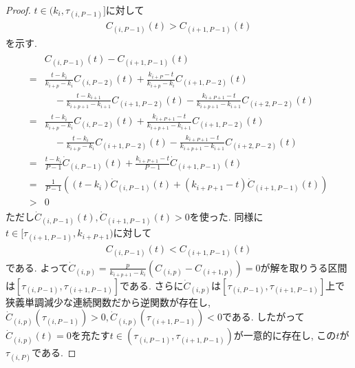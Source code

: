 \documentclass{jsarticle}
\newcommand\Pare[1]{\left(#1\right)}
\theoremstyle{definition}%
\begin{document}
\begin{proof}
    $t\in (k_{i},\tau_{(i,P-1)}]$に対して
    \begin{align}
        C_{(i,P-1)}(t)>C_{(i+1,P-1)}(t)
    \end{align}
    を示す.
    \begin{align}
        \begin{aligned}
            &{}C_{(i,P-1)}(t)-C_{(i+1,P-1)}(t) \\
            ={}&\frac{t-k_{i}}{k_{i+p}-k_{i}}C_{(i,P-2)}(t)+\frac{k_{i+P}-t}{k_{i+p}-k_{i}}C_{(i+1,P-2)}(t) \\
            &\quad-\frac{t-k_{i+1}}{k_{i+p+1}-k_{i+1}}C_{(i+1,P-2)}(t)-\frac{k_{i+P+1}-t}{k_{i+p+1}-k_{i+1}}C_{(i+2,P-2)}(t) \\
            ={}&\frac{t-k_{i}}{k_{i+p}-k_{i}}C_{(i,P-2)}(t)+\frac{k_{i+P+1}-t}{k_{i+p+1}-k_{i+1}}C_{(i+1,P-2)}(t) \\
            &\quad-\frac{t-k_{i}}{k_{i+p}-k_{i}}C_{(i+1,P-2)}(t)-\frac{k_{i+P+1}-t}{k_{i+p+1}-k_{i+1}}C_{(i+2,P-2)}(t) \\
            ={}&\frac{t-k_{i}}{P-1}\dot{C}_{(i,P-1)}(t)+\frac{k_{i+P+1}-t}{P-1}\dot{C}_{(i+1,P-1)}(t) \\
            ={}&\frac{1}{P-1}\Pare{\Pare{t-k_{i}}\dot{C}_{(i,P-1)}(t)+\Pare{k_{i+P+1}-t}\dot{C}_{(i+1,P-1)}(t)} \\
            >{}&0
        \end{aligned}
    \end{align}
    ただし$\dot{C}_{(i,P-1)}(t),\dot{C}_{(i+1,P-1)}(t)>0$を使った.
    同様に$t\in [\tau_{(i+1,P-1)},k_{i+P+1})$に対して
    \begin{align}
        C_{(i,P-1)}(t)<C_{(i+1,P-1)}(t)
    \end{align}
    である.
    よって$\dot{C}_{(i,p)}=\frac{p}{k_{i+p+1}-k_{i}}\Pare{C_{(i,p)}-C_{(i+1,p)}}=0$が解を取りうる区間は$[\tau_{(i,P-1)},\tau_{(i+1,P-1)}]$である.
    さらに$\dot{C}_{(i,p)}$は$[\tau_{(i,P-1)},\tau_{(i+1,P-1)}]$上で狭義単調減少な連続関数だから逆関数が存在し, $\dot{C}_{(i,p)}(\tau_{(i,P-1)})>0, \dot{C}_{(i,p)}(\tau_{(i+1,P-1)})<0$である.
    したがって$\dot{C}_{(i,p)}(t)=0$を充たす$t\in(\tau_{(i,P-1)},\tau_{(i+1,P-1)})$が一意的に存在し, この$t$が$\tau_{(i,P)}$である.
\end{proof}
\end{document}
